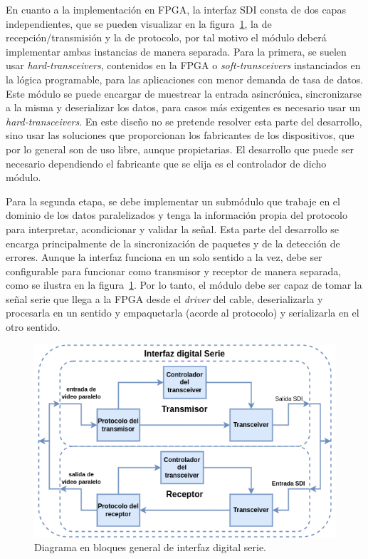   En cuanto a la implementación en FPGA, la interfaz SDI consta de dos capas
  independientes, que se pueden visualizar en la figura~\ref{fig:sdi1}, la de
  recepción/transmisión y la de protocolo, por tal motivo el módulo deberá
  implementar ambas instancias de manera separada. Para la primera, se suelen
  usar \textit{hard-transceivers}, contenidos en la FPGA o \textit{soft-transceivers}
  instanciados en la lógica programable, para las aplicaciones con menor demanda
  de tasa de datos. Este módulo se puede encargar de muestrear la entrada
  asincrónica, sincronizarse a la misma y deserializar los datos, para casos más
  exigentes es necesario usar un \textit{hard-transceivers}. En este diseño no se
  pretende resolver esta parte del desarrollo, sino usar las soluciones que
  proporcionan los fabricantes de los dispositivos, que por lo general son de uso
  libre, aunque propietarias. El desarrollo que puede ser necesario dependiendo
  el fabricante que se elija es el controlador de dicho módulo.

  Para la segunda etapa, se debe implementar un submódulo que trabaje en el dominio
  de los datos paralelizados y tenga la información propia del protocolo para
  interpretar, acondicionar y validar la señal. Esta parte del desarrollo se
  encarga principalmente de la sincronización de paquetes y de la detección de
  errores. Aunque la interfaz funciona en un solo sentido a la vez, debe ser
  configurable para funcionar como transmisor y receptor de manera separada, como
  se ilustra en la figura~\ref{fig:sdi1}. Por lo tanto, el módulo debe ser capaz
  de tomar la señal serie que llega a la FPGA desde el \textit{driver} del cable,
  deserializarla y procesarla en un sentido y empaquetarla (acorde al
  protocolo) y serializarla en el otro sentido.

  \vspace{1cm}
  \begin{figure}[htbp]
      \centering
      \includegraphics[width=\linewidth]{./Figures/sdi.png}
      \caption{Diagrama en bloques general de interfaz digital serie.}\label{fig:sdi1}
  \end{figure}
  \vspace{1cm}

